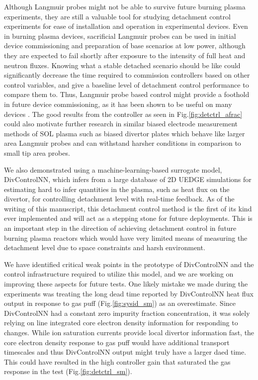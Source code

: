 Although Langmuir probes might not be able to survive future burning plasma experiments, they are still a valuable tool for studying detachment control experiments for ease of installation and operation in experimental devices.
Even in burning plasma devices, sacrificial Langmuir probes can be used in initial device commissioning and preparation of base scenarios at low power, although they are expected to fail shortly after exposure to the intensity of full heat and neutron fluxes.
Knowing what a stable detached scenario should be like could significantly decrease the time required to commission controllers based on other control variables, and give a baseline level of detachment control performance to compare them to.
Thus, Langmuir probe based control might provide a foothold in future device commissioning, as it has been shown to be useful on many devices \cite{Eldon_2021_NME, Guillemaut_2017_PPCF, Yuan_2020_FED, Khodunov_2021_PPCF}.
The good results from the \Afrac{} controller as seen in Fig.\ref{fig:detctrl_afrac} could also motivate further research in similar biased electrode measurement methods of SOL plasma such as biased divertor plates \cite{Toi_2023_NF, Cui_2024_NF} which behave like larger area Langmuir probes and can withstand harsher conditions in comparison to small tip area probes.

We also demonstrated using a machine-learning-based surrogate model, DivControlNN, which infers from a large database of 2D UEDGE simulations for estimating hard to infer quantities in the plasma, such as heat flux on the divertor, for controlling detachment level with real-time feedback.
As of the writing of this manuscript, this detachment control method is the first of its kind ever implemented and will act as a stepping stone for future deployments.
This is an important step in the direction of achieving detachment control in future burning plasma reactors which would have very limited means of measuring the detachment level due to space constraints and harsh environment.

We have identified critical weak points in the prototype of DivControlNN and the control infrastructure required to utilize this model, and we are working on improving these aspects for future tests.
One likely mistake we made during the experiments was treating the long dead time reported by DivControlNN heat flux output in response to gas puff (Fig.\ref{fig:sysid_sm}) as an overestimate.
Since DivControlNN had a constant zero impurity fraction concentration, it was solely relying on line integrated core electron density information for responding to changes.
While ion saturation currents provide local divertor information fast, the core electron density response to gas puff would have additional transport timescales and thus DivControlNN output might truly have a larger daed time.
This could have resulted in the high controller gain that saturated the gas response in the test (Fig.\ref{fig:detctrl_sm}).

